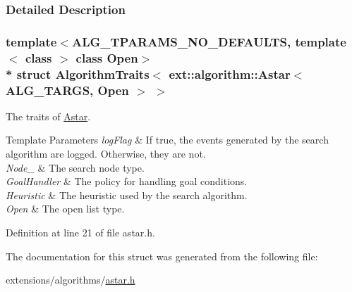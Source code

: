 \subsubsection{Detailed Description}
\subsubsection*{template$<$A\+L\+G\+\_\+\+T\+P\+A\+R\+A\+M\+S\+\_\+\+N\+O\+\_\+\+D\+E\+F\+A\+U\+L\+TS, template$<$ class $>$ class Open$>$\\*
struct Algorithm\+Traits$<$ ext\+::algorithm\+::\+Astar$<$ A\+L\+G\+\_\+\+T\+A\+R\+G\+S, Open $>$ $>$}

The traits of \hyperlink{structAstar}{Astar}. 


\begin{DoxyTemplParams}{Template Parameters}
{\em log\+Flag} & If {\ttfamily true}, the events generated by the search algorithm are logged. Otherwise, they are not. \\
\hline
{\em Node\+\_\+} & The search node type. \\
\hline
{\em Goal\+Handler} & The policy for handling goal conditions. \\
\hline
{\em Heuristic} & The heuristic used by the search algorithm. \\
\hline
{\em Open} & The open list type. \\
\hline
\end{DoxyTemplParams}


Definition at line 21 of file astar.\+h.



The documentation for this struct was generated from the following file\+:\begin{DoxyCompactItemize}
\item 
extensions/algorithms/\hyperlink{astar_8h}{astar.\+h}\end{DoxyCompactItemize}
